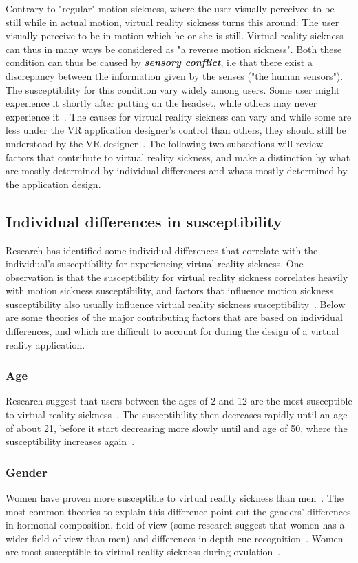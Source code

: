 Contrary to "regular" motion sickness, where the user visually perceived to be still while in actual motion, 
virtual reality sickness turns this around: The user visually perceive to be in motion which he or she is still. 
Virtual reality sickness can thus in many ways be considered as "a reverse motion sickness". Both these condition can thus be caused by
\textbf{\textit{sensory conflict}}, i.e that there exist a discrepancy between the information given by the senses ("the human sensors").
The susceptibility for this condition vary widely among users. Some user might experience it shortly after putting on the headset, 
while others may never experience it~\citep{Stanney2003}.
The causes for virtual reality sickness can vary and while some are less under the VR application designer's control than others, 
they should still be understood by the VR designer~\citep{Stanney2003}. 
The following two subsections will review factors that contribute to virtual reality sickness, and make a distinction by
what are mostly determined by individual differences and whats mostly determined by the application design. 

\subsection{Individual differences in susceptibility}
Research has identified some individual differences that correlate with the individual's susceptibility for experiencing virtual reality sickness. 
One observation is that the susceptibility for virtual reality sickness correlates heavily with motion sickness susceptibility, and 
factors that influence motion sickness susceptibility also usually influence virtual reality sickness susceptibility~\citep{Stanney2003}.
Below are some theories of the major contributing factors that are based on individual differences, and which are difficult to account for during the design of a virtual reality application.


\subsubsection{Age}
Research suggest that users between the ages of 2 and 12 are the most susceptible to virtual reality sickness~\citep{Kolasinski1995}. The susceptibility then decreases
rapidly until an age of about 21, before it start decreasing more slowly until and age of 50, where the susceptibility increases again~\citep{Brooks2010}.

\subsubsection{Gender}
Women have proven more susceptible to virtual reality sickness than men~\citep{Kennedy1985}. The most common theories to explain this difference point out the genders' differences
in hormonal composition, field of view (some research suggest that women has a wider field of view than men) and differences in depth cue recognition~\citep{Biomed2012}. 
Women are most susceptible to virtual reality sickness during ovulation~\citep{Clemes2005}.

